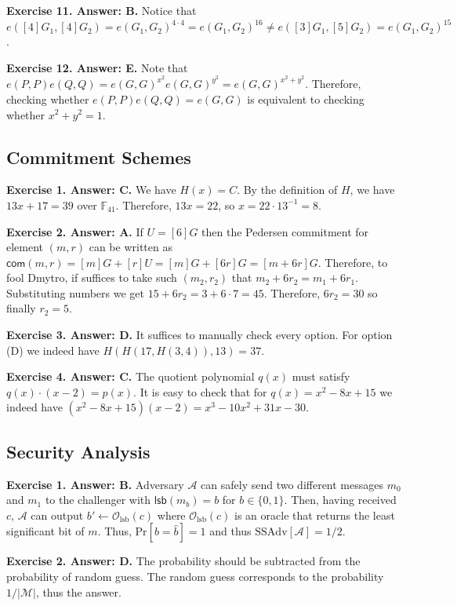 \documentclass[../lecture-notes-148x210.tex]{subfiles}
\begin{document}
\textbf{Exercise 11. Answer: B.} Notice that $e([4]G_1,[4]G_2)=e(G_1,G_2)^{4 \cdot 4} = e(G_1,G_2)^{16} \neq e([3]G_1,[5]G_2)=e(G_1,G_2)^{15}$.

\textbf{Exercise 12. Answer: E.} Note that
$e(P,P)e(Q,Q)=e(G,G)^{x^2}e(G,G)^{y^2}=e(G,G)^{x^2+y^2}$. Therefore, checking
whether $e(P,P)e(Q,Q)=e(G,G)$ is equivalent to checking whether $x^2+y^2=1$.

\subsection*{Commitment Schemes}

\textbf{Exercise 1. Answer: C.} We have $H(x)=C$. By the definition of $H$,
we have $13x+17=39$ over $\mathbb{F}_{41}$. Therefore, $13x=22$,
so $x=22 \cdot 13^{-1} = 8$. 

\textbf{Exercise 2. Answer: A.} If $U=[6]G$ then the Pedersen commitment for element
$(m,r)$ can be written as $\mathsf{com}(m,r) = [m]G+[r]U=[m]G+[6r]G=[m+6r]G$.
Therefore, to fool Dmytro, if suffices to take such $(m_2,r_2)$ that
$m_2+6r_2=m_1+6r_1$. Substituting numbers we get $15+6r_2=3+6\cdot 7=45$.
Therefore, $6r_2=30$ so finally $r_2=5$.

\textbf{Exercise 3. Answer: D.} It suffices to manually check every option. For
option (D) we indeed have $H(H(17, H(3,4)), 13) = 37$.  

\textbf{Exercise 4. Answer: C.} The quotient polynomial $q(x)$ must satisfy
$q(x)\cdot (x-2)=p(x)$. It is easy to check that for $q(x)=x^2-8x+15$ we indeed
have $(x^2-8x+15)(x-2) = x^3-10x^2+31x-30$.

\subsection*{Security Analysis}

\textbf{Exercise 1. Answer: B.} Adversary $\mathcal{A}$ can safely send two
different messages $m_0$ and $m_1$ to the challenger with $\mathsf{lsb}(m_b)=b$
for $b \in \{0,1\}$. Then, having received $c$, $\mathcal{A}$ can output $b'
\gets \mathcal{O}_{\text{lsb}}(c)$ where $\mathcal{O}_{\text{lsb}}(c)$ is an
oracle that returns the least significant bit of $m$. Thus,
$\text{Pr}[b=\hat{b}] = 1$ and thus $\text{SSAdv}[\mathcal{A}]=1/2$.

\textbf{Exercise 2. Answer: D.} The probability should be subtracted from 
the probability of random guess. The random guess corresponds to the probability 
$1/|\mathcal{M}|$, thus the answer.
\end{document}
